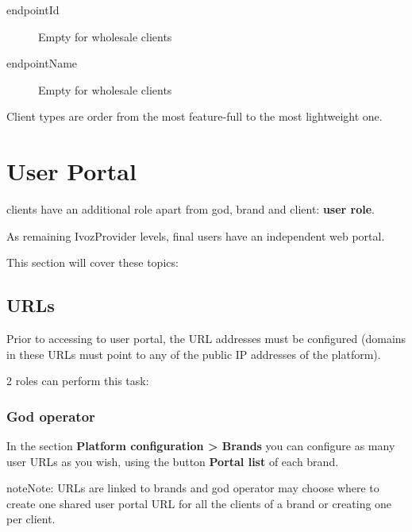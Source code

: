 \documentclass[letterpaper,10pt,english]{sphinxmanual}
\begin{document}
\begin{description}
\item[{endpointId}] \leavevmode{}\label{administration_portal/client/wholesale/calls/call_csv_schedulers:term-endpointid}
Empty for wholesale clients

\item[{endpointName}] \leavevmode{}\label{administration_portal/client/wholesale/calls/call_csv_schedulers:term-endpointname}
Empty for wholesale clients

\end{description}

Client types are order from the most feature-full to the most lightweight one.


\chapter{User Portal}
\label{user_portal/index:userportal}\label{user_portal/index:user-portal}\label{user_portal/index::doc}
{\hyperref[administration_portal/brand/clients/virtual_pbx:virtual\string-pbx]{}} clients have an additional role apart from god, brand and client: \textbf{user role}.

As remaining IvozProvider levels, final users have an independent web portal.

This section will cover these topics:


\section{URLs}
\label{user_portal/urls::doc}\label{user_portal/urls:urls}
Prior to accessing to user portal, the URL addresses must be configured (domains
in these URLs must point to any of the public IP addresses of the platform).

2 roles can perform this task:


\subsection{God operator}
\label{user_portal/urls:god-operator}
In the section \textbf{Platform configuration \textgreater{} Brands} you can configure as many
user URLs as you wish, using the button \textbf{Portal list} of each brand.

\begin{notice}{note}{Note:}
URLs are linked to brands and god operator may choose where to create
one shared user portal URL for all the clients of a brand or creating
one per client.
\end{notice}
\end{document}
